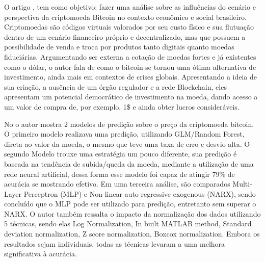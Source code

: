 \documentclass[sigplan,screen]{acmart}
\begin{document}
O artigo \cite{dos2021cenario}, tem como objetivo: fazer uma análise sobre as influências do cenário e perspectiva da criptomoeda Bitcoin no contexto econômico e social brasileiro.
Criptomoedas são códigos virtuais valorados por seu custo físico e sua flutuação dentro de um cenário financeiro próprio e decentralizado, mas que possuem a possibilidade de venda e troca por produtos tanto digitais quanto moedas fiduciárias.
Argumentando ser externa a cotação de moedas fortes e já existentes como o dólar, o autor fala de como o bitcoin se tornou uma ótima alternativa de investimento, ainda mais em contextos de crises globais.
Apresentando a ideia de sua criação, a ausência de um órgão regulador e a rede Blockchain, eles apresentam um potencial democrático de investimento na moeda, dando acesso a um valor de compra de, por exemplo, 1\$ e ainda obter lucros consideráveis.

No \cite{8323676} o autor mostra 2 modelos de predição sobre o preço da criptomoeda bitcoin.
O primeiro modelo realizava uma predição, utilizando GLM/Random Forest, direta ao valor da moeda, o mesmo que teve uma taxa de erro e desvio alta.
O segundo Modelo trouxe uma estratégia um pouco diferente, sua predição é baseada na tendência de subida/queda da moeda, mediante a utilização de uma rede neural artificial, dessa forma esse modelo foi capaz de atingir 79\% de acurácia se mostrando efetivo.
Em uma terceira análise, são comparados Multi-Layer Perceptron (MLP) e Non-linear auto-regressive exogenous (NARX), sendo concluído que o MLP pode ser utilizado para predição, entretanto sem superar o NARX.
O autor também ressalta o impacto da normalização dos dados utilizando 5 técnicas, sendo elas Log Normalization, In built MATLAB method, Standard deviation normalization, Z score normalization, Boxcox normalization.
Embora os resultados sejam individuais, todas as técnicas levaram a uma melhora significativa à acurácia.   











\end{document}
